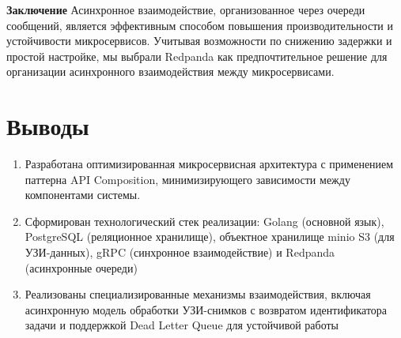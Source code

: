 \textbf{Заключение}
Асинхронное взаимодействие, организованное через очереди сообщений, является эффективным способом повышения производительности и устойчивости микросервисов. Учитывая возможности по снижению задержки и простой настройке, мы выбрали Redpanda как предпочтительное решение для организации асинхронного взаимодействия между микросервисами.

\section{Выводы}


\begin{enumerate}
	\item Разработана оптимизированная микросервисная архитектура с применением паттерна API Composition, минимизирующего зависимости между компонентами системы.
    \item Сформирован технологический стек реализации: Golang (основной язык), PostgreSQL (реляционное хранилище), объектное хранилище minio S3 (для УЗИ-данных), gRPC (синхронное взаимодействие) и Redpanda (асинхронные очереди)
    \item Реализованы специализированные механизмы взаимодействия, включая асинхронную модель обработки УЗИ-снимков с возвратом идентификатора задачи и поддержкой Dead Letter Queue для устойчивой работы
\end{enumerate}









